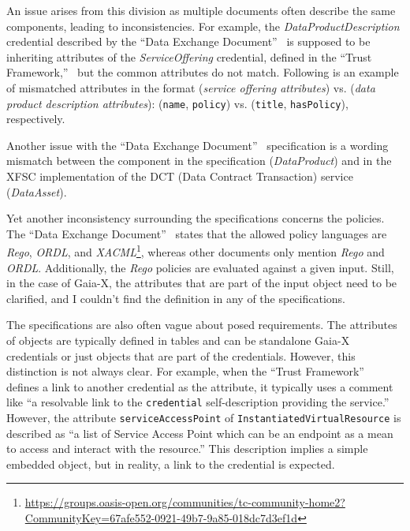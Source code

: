 An issue arises from this division as multiple documents often describe the same components, leading to inconsistencies.
For example, the \textit{DataProductDescription} credential described by the ``Data Exchange Document''~\cite{gaiax_data_exchange_document} is supposed to be inheriting attributes of the \textit{ServiceOffering} credential, defined in the ``Trust Framework,''~\cite{gaiax_trust_framework} but the common attributes do not match.
Following is an example of mismatched attributes in the format (\textit{service offering attributes}) vs. (\textit{data product description attributes}): (\texttt{name}, \texttt{policy}) vs. (\texttt{title}, \texttt{hasPolicy}), respectively.

Another issue with the ``Data Exchange Document''~\cite{gaiax_data_exchange_document} specification is a wording mismatch between the component in the specification (\textit{DataProduct}) and in the XFSC implementation of the DCT (Data Contract Transaction) service (\textit{DataAsset}).

Yet another inconsistency surrounding the specifications concerns the policies.
The ``Data Exchange Document''~\cite{gaiax_data_exchange_document} states that the allowed policy languages are \textit{Rego}, \textit{ORDL}, and \textit{XACML}\footnote{\url{https://groups.oasis-open.org/communities/tc-community-home2?CommunityKey=67afe552-0921-49b7-9a85-018dc7d3ef1d}}, whereas other documents only mention \textit{Rego} and \textit{ORDL}.
Additionally, the \textit{Rego} policies are evaluated against a given input.
Still, in the case of Gaia-X, the attributes that are part of the input object need to be clarified, and I couldn't find the definition in any of the specifications.

The specifications are also often vague about posed requirements.
The attributes of objects are typically defined in tables and can be standalone Gaia-X credentials or just objects that are part of the credentials.
However, this distinction is not always clear.
For example, when the ``Trust Framework''~\cite{gaiax_trust_framework} defines a link to another credential as the attribute, it typically uses a comment like ``a resolvable link to the \texttt{credential} self-description providing the service.''
However, the attribute \texttt{serviceAccessPoint} of \texttt{InstantiatedVirtualResource} is described as ``a list of Service Access Point which can be an endpoint as a mean to access and interact with the resource.''
This description implies a simple embedded object, but in reality, a link to the credential is expected.

